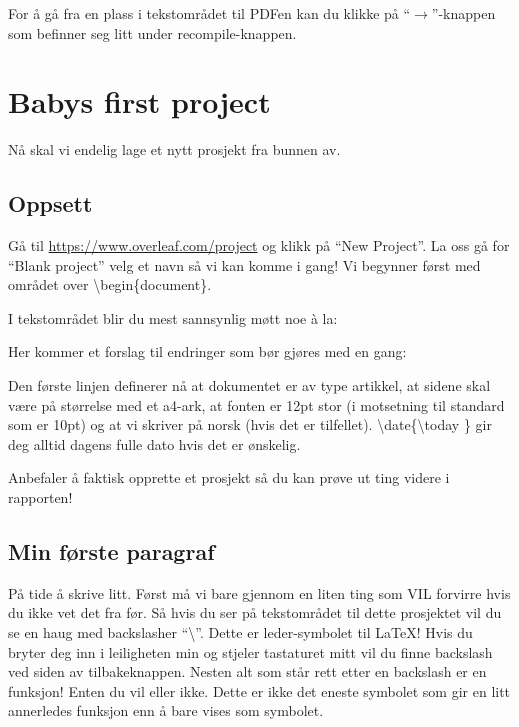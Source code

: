         For å gå fra en plass i tekstområdet til PDFen kan du klikke på ``$\longrightarrow$''-knappen som befinner seg litt under recompile-knappen.


\section{Babys first project}
    Nå skal vi endelig lage et nytt prosjekt fra bunnen av.
    
    \subsection{Oppsett} 
        Gå til \url{https://www.overleaf.com/project} og klikk på ``New Project''.
        La oss gå for ``Blank project'' velg et navn så vi kan komme i gang!
        Vi begynner først med området over \textbackslash begin\{document\}.
        
        I tekstområdet blir du mest sannsynlig møtt noe \`a la:
        
        
        \vspace{3mm}
        Her kommer et forslag til endringer som bør gjøres med en gang:
        
        
        Den første linjen definerer nå at dokumentet er av type artikkel, at sidene skal være på størrelse med et a4-ark, at fonten er 12pt stor (i motsetning til standard som er {\tiny 10pt}) og at vi skriver på norsk (hvis det er tilfellet).
        \textbackslash date\{\textbackslash today \} gir deg alltid dagens fulle dato hvis det er ønskelig.
        
        Anbefaler å faktisk opprette et prosjekt så du kan prøve ut ting videre i rapporten!
        
    \subsection{Min første paragraf}
        På tide å skrive litt. Først må vi bare gjennom en liten ting som VIL forvirre hvis du ikke vet det fra før.
        Så hvis du ser på tekstområdet til dette prosjektet vil du se en haug med backslasher ``\textbackslash''. Dette er leder-symbolet til \LaTeX!
        Hvis du bryter deg inn i leiligheten min og stjeler tastaturet mitt vil du finne backslash ved siden av tilbakeknappen.
        Nesten alt som står rett etter en backslash er en funksjon! Enten du vil eller ikke. 
        Dette er ikke det eneste symbolet som gir en litt annerledes funksjon enn å bare vises som symbolet. 
        
